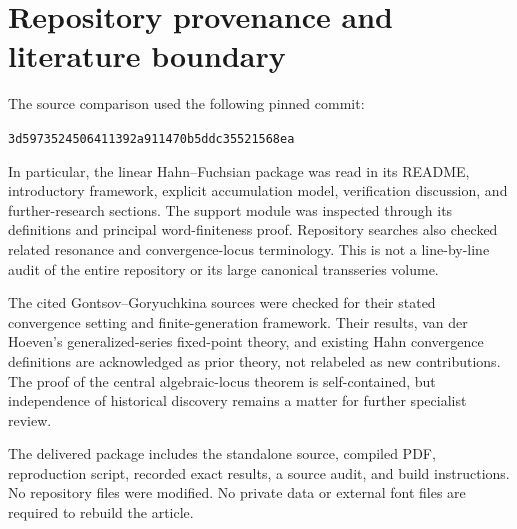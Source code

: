 \documentclass[11pt,a4paper]{article}
\numberwithin{equation}{section}
\theoremstyle{definition}
\theoremstyle{remark}
\newcommand{\snap}{\texttt{3d5973524506411392a911470b5ddc35521568ea}}
\begin{document}
\section{Repository provenance and literature boundary}
\label{app:provenance}

The source comparison used the following pinned commit:
\begin{center}\snap\end{center}
In particular, the linear Hahn--Fuchsian package was read in its README, introductory
framework, explicit accumulation model, verification discussion, and
further-research sections. The support module
was inspected through its definitions and principal word-finiteness proof.
Repository searches also checked related resonance and convergence-locus
terminology. This is not a line-by-line audit of the entire repository or
its large canonical transseries volume.

The cited Gontsov--Goryuchkina sources were checked for their stated
convergence setting and finite-generation framework. Their results,
van der Hoeven's generalized-series fixed-point theory, and existing Hahn
convergence definitions are acknowledged as prior theory, not relabeled as
new contributions. The proof of the central algebraic-locus theorem is
self-contained, but independence of historical discovery remains a matter
for further specialist review.

The delivered package includes the standalone source, compiled PDF,
reproduction script, recorded exact results, a source audit, and build
instructions. No repository files were modified. No private data or
external font files are required to rebuild the article.
\end{document}
